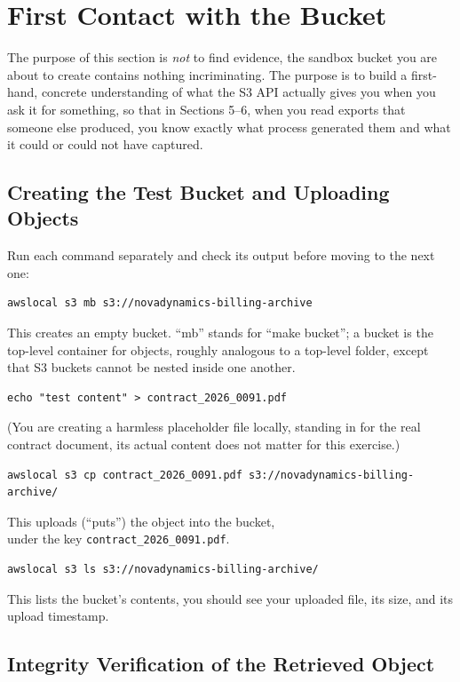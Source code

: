 \section{First Contact with the Bucket}

The purpose of this section is \emph{not} to find evidence, the sandbox bucket you are about
to create contains nothing incriminating. The purpose is to build a first-hand, concrete
understanding of what the S3 API actually gives you when you ask it for something, so that in
Sections 5--6, when you read exports that someone else produced, you know exactly what process
generated them and what it could or could not have captured.

\subsection{Creating the Test Bucket and Uploading Objects}

Run each command separately and check its output before moving to the next one:
\begin{lstlisting}
awslocal s3 mb s3://novadynamics-billing-archive
\end{lstlisting}
This creates an empty bucket. ``mb'' stands for ``make bucket''; a bucket is the top-level
container for objects, roughly analogous to a top-level folder, except that S3 buckets cannot be
nested inside one another.

\begin{lstlisting}
echo "test content" > contract_2026_0091.pdf
\end{lstlisting}
(You are creating a harmless placeholder file locally, standing in for the real contract
document, its actual content does not matter for this exercise.)

\begin{lstlisting}
awslocal s3 cp contract_2026_0091.pdf s3://novadynamics-billing-archive/
\end{lstlisting}
This uploads (``puts'') the object into the bucket,\\ under the key
\texttt{contract\_2026\_0091.pdf}.

\begin{lstlisting}
awslocal s3 ls s3://novadynamics-billing-archive/
\end{lstlisting}
This lists the bucket's contents, you should see your uploaded file, its size, and its upload
timestamp.

\subsection{Integrity Verification of the Retrieved Object}

